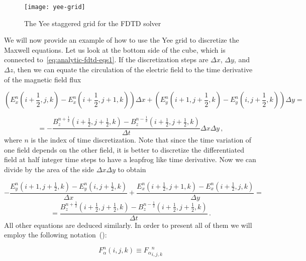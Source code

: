\documentclass[12pt, class=report, crop=false]{standalone}
\begin{document}
\begin{figure}[h]
  \centering
  \texttt{[image: yee-grid]}%
  \caption{The Yee staggered grid for the FDTD solver}\label{fig:yee}%
\end{figure}

We will now provide an example of how to use the Yee grid to discretize the Maxwell equations. Let us look at the bottom side of the cube, which is connected to~\cref{eq:analytic-fdtd-eqs1}. If the discretization steps are \(\Delta x\), \(\Delta y\), and \(\Delta z\), then we can equate the circulation of the electric field to the time derivative of the magnetic field flux

\begin{equation*}
  \left(E_x^n \left(i+\frac{1}{2},j,k\right) - E_x^n \left(i+\frac{1}{2},j+1,k\right) \right)\Delta x +
  \left(E_y^n \left(i+1,j+\frac{1}{2},k\right)- E_y^n \left(i,j+\frac{1}{2},k\right)\right) \Delta y
  =
\end{equation*}

\begin{equation*}
  = -\frac{B_z^{n+\frac{1}{2}} \left(i+\frac{1}{2},j+\frac{1}{2},k\right) - B_z^{n-\frac{1}{2}} \left(i+\frac{1}{2},j+\frac{1}{2},k\right)}{\Delta t} \Delta x \Delta y\,,
\end{equation*}
where \(n\) is the index of time discretization. Note that since the time variation of one field depends on the other field, it is better to discretize the differentiated field at half integer time steps to have a leapfrog like time derivative. Now we can divide by the area of the side \(\Delta x \Delta y\) to obtain

\begin{equation*}
  - \frac{E_y^n (i+1,j+\frac{1}{2},k) - E_y^n (i,j+\frac{1}{2},k)}{\Delta x} + \frac{E_x^n (i+\frac{1}{2},j+1,k) - E_x^n (i+\frac{1}{2},j,k)}{\Delta y} =
\end{equation*}
\begin{equation*}
  = \frac{B_z^{n+\frac{1}{2}} (i+\frac{1}{2},j+\frac{1}{2},k) - B_z^{n-\frac{1}{2}} (i+\frac{1}{2},j+\frac{1}{2},k)}{\Delta t}\,.
\end{equation*}
All other equations are deduced similarly. In order to present all of them we will employ the following notation~(\cite{leheElectromagneticParticleInCellCodes2016}):

\begin{equation*}
  F_\alpha^n (i,j,k) \equiv {F_\alpha}^n_{i,j,k}
\end{equation*}
\end{document}
